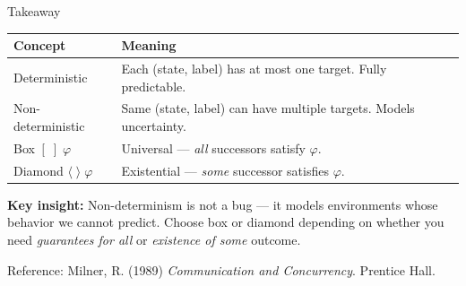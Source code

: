 \begin{frame}{Takeaway}
  \begin{center}
  \begin{tabularx}{0.88\textwidth}{lX}
    \toprule
    \textbf{Concept}  & \textbf{Meaning} \\
    \midrule
    Deterministic      & Each (state, label) has at most one target. Fully predictable. \\
    Non-deterministic  & Same (state, label) can have multiple targets. Models uncertainty. \\
    \midrule
    Box $[\;]\;\varphi$          & Universal --- \emph{all} successors satisfy $\varphi$. \\
    Diamond $\langle\;\rangle\;\varphi$ & Existential --- \emph{some} successor satisfies $\varphi$. \\
    \bottomrule
  \end{tabularx}
  \end{center}

  \bigskip
  \textbf{Key insight:} Non-determinism is not a bug --- it models environments whose behavior
  we cannot predict. Choose box or diamond depending on whether you need \emph{guarantees for all}
  or \emph{existence of some} outcome.

  \medskip
  {\scriptsize\color{ubaGray} Reference: Milner, R. (1989) \emph{Communication and Concurrency}. Prentice Hall.}
\end{frame}


